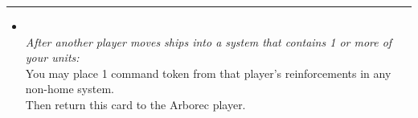 \begin{multicols}{2}
\vspace{-10pt}\rule{\hsize}{0.4pt}\vspace{5pt}


\begin{itemize}
\item {}\\
\emph{After another player moves ships into a system that contains 1 or more of your units:}\\
You may place 1 command token from that player's reinforcements in any non-home system.
\\
Then return this card to the Arborec player.
\end{itemize}

\end{multicols}

